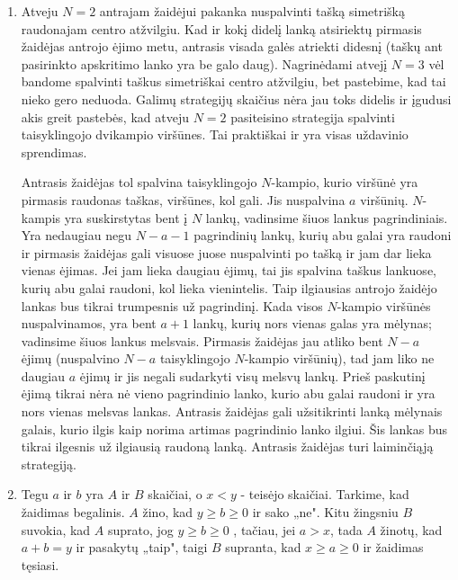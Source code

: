 \begin{enumerate}
(Sprendimas Nr. 2) Susižymėkime lentelės langelius kaip kordinates $(x,y)$, kur $x$, $y$ yra
teigiami sveikieji. Tarkime, kad žirgo pastatymas $(1,1)$ langelyje ir
paėjimas į langelį $(3,2)$ įstumia $A$ į pralaiminčią poziciją (kitu atveju
įrodymas jau yra baigtas). Tada $B$ savo ėjimu peina į langelį $(X,Y)$ taip,
kad $A$ vėl atsidurtų pralaiminčioje pozicijoje. Pastebime, kad jei $A$ pirmu
ėjimu pastato žirgą į $(2,3)$, tada ėjimas į $(Y,X)$ garantuoja $A$ pergalę.
Dabartinė situacija nuo pirmosios skiriasi tik tuo, kad žirgas nepabuvojo
langelyje $(1,1)$. Tačiau šis langelis yra nepasiekiamas $B$, tad tai nedaro įtakos baigčiai.
\item
Atveju $N=2$ antrajam žaidėjui pakanka nuspalvinti tašką simetrišką
raudonajam centro atžvilgiu. Kad ir kokį didelį lanką atsiriektų pirmasis
žaidėjas antrojo ėjimo metu, antrasis visada galės atriekti didesnį (taškų
ant pasirinkto apskritimo lanko yra be galo daug). Nagrinėdami atvejį
$N=3$ vėl bandome spalvinti taškus simetriškai centro atžvilgiu, bet
pastebime, kad tai nieko gero neduoda. Galimų strategijų skaičius nėra jau
toks didelis ir įgudusi akis greit pastebės, kad atveju $N=2$ pasiteisino
strategija spalvinti taisyklingojo dvikampio viršūnes. Tai praktiškai ir
yra visas uždavinio sprendimas. 

Antrasis žaidėjas tol spalvina taisyklingojo $N$-kampio, kurio viršūnė yra
pirmasis raudonas taškas, viršūnes, kol gali. Jis nuspalvina $a$ viršūnių.
$N$-kampis yra suskirstytas bent į $N$ lankų, vadinsime šiuos lankus
pagrindiniais. Yra nedaugiau negu $N-a-1$ pagrindinių lankų, kurių abu
galai yra raudoni ir pirmasis žaidėjas gali visuose juose nuspalvinti po
tašką ir jam dar lieka vienas ėjimas. Jei jam lieka daugiau ėjimų, tai jis
spalvina taškus lankuose, kurių abu galai raudoni, kol lieka vienintelis.
Taip ilgiausias antrojo žaidėjo lankas bus tikrai trumpesnis už
pagrindinį. Kada visos $N$-kampio viršūnės nuspalvinamos, yra bent $a+1$
lankų, kurių nors vienas galas yra mėlynas; vadinsime šiuos lankus
melsvais. Pirmasis žaidėjas jau atliko bent $N-a$ ėjimų (nuspalvino $N-a$
taisyklingojo $N$-kampio viršūnių), tad jam liko ne daugiau $a$ ėjimų ir jis
negali sudarkyti visų melsvų lankų. Prieš paskutinį ėjimą tikrai nėra nė
vieno pagrindinio lanko, kurio abu galai raudoni ir yra nors vienas
melsvas lankas. Antrasis žaidėjas gali užsitikrinti lanką mėlynais galais,
kurio ilgis kaip norima artimas pagrindinio lanko ilgiui. Šis lankas bus
tikrai ilgesnis už ilgiausią raudoną lanką. Antrasis žaidėjas turi
laiminčiąją strategiją.
\item
Tegu $a$ ir $b$ yra $A$ ir $B$ skaičiai, o $x<y$ - teisėjo skaičiai.
Tarkime, kad žaidimas begalinis. $A$ žino, kad   $y\geq b\geq0$  ir sako
„ne". Kitu žingsniu $B$ suvokia, kad $A$ suprato, jog $y\geq b\geq0$ ,
tačiau, jei $a>x$, tada $A$ žinotų, kad $a+b=y$ ir pasakytų „taip", taigi
$B$ supranta, kad $x\geq a\geq0$ ir žaidimas tęsiasi. 


\end{enumerate}
